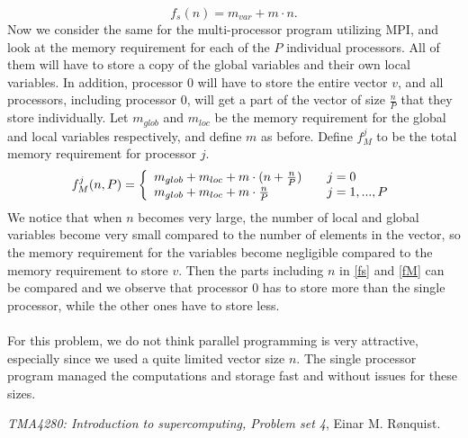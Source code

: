 \documentclass{article}
\begin{document}
\begin{equation}
\label{fs}
f_{s}(n) =  m_{var} + m\cdot n.
\end{equation}
Now we consider the same for the multi-processor program utilizing MPI, and look at the memory requirement for each of the $P$ individual processors. All of them will have to store a copy of the global variables and their own local variables. In addition, processor $0$ will have to store the entire vector $v$, and all processors, including processor 0, will get a part of the vector of size $\frac{n}{P}$ that they store individually. Let $m_{glob}$ and $m_{loc}$ be the memory requirement for the global and local variables respectively, and define $m$ as before. Define $f_M^j$ to be the total memory requirement for processor $j$.
\begin{equation}
\label{fM}
f_M^j(n,P) = \left\{
  				\begin{array}{l l}
  				m_{glob} + m_{loc} + m\cdot (n + \frac{n}{P}) & \quad j = 0\\
  				m_{glob} + m_{loc} + m\cdot \frac{n}{P} & \quad j = 1,...,P
  				\end{array} \right.
\end{equation}
We notice that when $n$ becomes very large, the number of local and global variables become very small compared to the number of elements in the vector, so the memory requirement for the variables become negligible compared to the memory requirement to store $v$. Then the parts including $n$ in \eqref{fs} and \eqref{fM} can be compared and we observe that processor $0$ has to store more than the single processor, while the other ones have to store less. 
\\
\\
For this problem, we do not think parallel programming is very attractive, especially since we used a quite limited  vector size $n$. The single processor program managed the computations and storage fast and without issues for these sizes.
\begin{thebibliography}{99}
\emph{TMA4280: Introduction to supercomputing, Problem set 4}, Einar M. Rønquist.
\end{thebibliography} 
\end{document}
